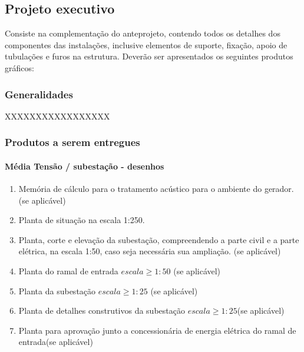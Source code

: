 \subsection{Projeto executivo} \label{subsection: etapa-PE}

Consiste na complementação do anteprojeto, contendo todos os detalhes dos componentes das instalações, inclusive elementos de suporte, fixação, apoio de tubulações e furos na estrutura. Deverão ser apresentados os seguintes produtos gráficos:
\subsubsection{Generalidades}
XXXXXXXXXXXXXXXXX

\subsubsection{Produtos a serem entregues}

\paragraph{Média Tensão / subestação - desenhos}

	\begin{enumerate}
			\item Memória de cálculo para o tratamento acústico para o ambiente do gerador. (se aplicável)
		
		\item Planta de situação na escala 1:250.
		
		\item Planta, corte e elevação da subestação, compreendendo a parte civil e a parte elétrica, na escala 1:50, caso seja necessária sua ampliação. (se aplicável)
		
		\item Planta do ramal de entrada $escala \geq 1:50$ (se aplicável)
		
		\item Planta da subestação $escala \geq 1:25$ (se aplicável)
		
		\item Planta de detalhes construtivos da subestação $escala \geq 1:25$(se aplicável)
		
		\item Planta para aprovação junto a concessionária de energia elétrica do ramal de entrada(se aplicável)
	\end{enumerate}


